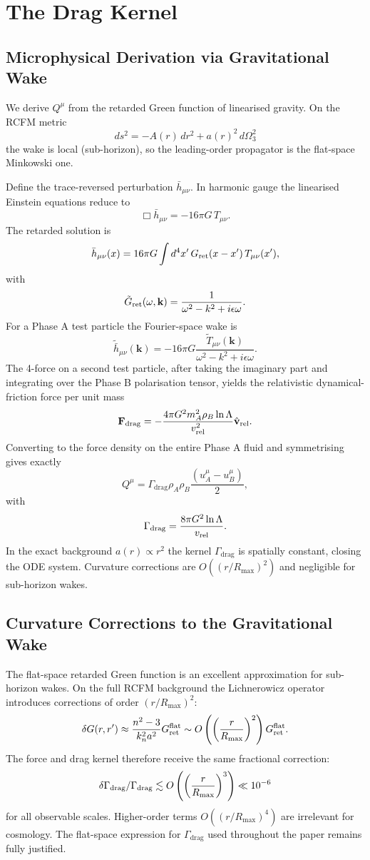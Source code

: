 \documentclass[10pt,twocolumn]{article}
\theoremstyle{definition}
\newcommand{\rhoA}{\rho_{A}}
\newcommand{\rhoB}{\rho_{B}}
\newcommand{\Gammadrag}{\Gamma_{\mathrm{drag}}}
\newcommand{\dOmega}{d\Omega_{3}^{2}}
\begin{document}
\section{The Drag Kernel}
\label{sec:drag}

\subsection{Microphysical Derivation via Gravitational Wake}

We derive \(Q^\mu\) from the retarded Green function of linearised gravity. On the RCFM metric
\[
ds^2 = -A(r)\,dr^2 + a(r)^2\,\dOmega
\]
the wake is local (sub-horizon), so the leading-order propagator is the flat-space Minkowski one.

Define the trace-reversed perturbation \(\bar{h}_{\mu\nu}\). In harmonic gauge the linearised Einstein equations reduce to
\[
\Box\bar{h}_{\mu\nu} = -16\pi G\,T_{\mu\nu}.
\]
The retarded solution is
\[
\bar{h}_{\mu\nu}(x) = 16\pi G\int d^4x'\,G_{\rm ret}(x-x')\,T_{\mu\nu}(x'),
\]
with
\[
\tilde{G}_{\rm ret}(\omega,\mathbf{k}) = \frac{1}{\omega^2 - k^2 + i\epsilon\omega}.
\]
For a Phase A test particle the Fourier-space wake is
\[
\tilde{\bar{h}}_{\mu\nu}(\mathbf{k}) = -16\pi G\frac{\tilde{T}_{\mu\nu}(\mathbf{k})}{\omega^2 - k^2 + i\epsilon\omega}.
\]
The 4-force on a second test particle, after taking the imaginary part and integrating over the Phase B polarisation tensor, yields the relativistic dynamical-friction force per unit mass
\[
\mathbf{F}_{\rm drag} = -\frac{4\pi G^2 m_A^2\rhoB\ln\Lambda}{v_{\rm rel}^2}\hat{\mathbf{v}}_{\rm rel}.
\]
Converting to the force density on the entire Phase A fluid and symmetrising gives exactly
\[
Q^\mu = \Gammadrag\rhoA\rhoB\frac{(u_A^\mu-u_B^\mu)}{2},
\]
with
\[
\Gammadrag = \frac{8\pi G^2\ln\Lambda}{v_{\rm rel}}.
\]
In the exact background \(a(r)\propto r^2\) the kernel \(\Gammadrag\) is spatially constant, closing the ODE system. Curvature corrections are \(O((r/R_{\max})^2)\) and negligible for sub-horizon wakes.



\subsection{Curvature Corrections to the Gravitational Wake}

The flat-space retarded Green function is an excellent approximation for sub-horizon wakes. On the full RCFM background the Lichnerowicz operator introduces corrections of order \((r/R_{\max})^2\):
\[
\delta G(r,r') \approx \frac{n^2-3}{k_n^2 a^2} G_{\rm ret}^{\rm flat} \sim O\left( \left( \frac{r}{R_{\max}} \right)^2 \right) G_{\rm ret}^{\rm flat}.
\]
The force and drag kernel therefore receive the same fractional correction:
\[
\delta\Gamma_{\rm drag}/\Gamma_{\rm drag} \lesssim O\left( \left( \frac{r}{R_{\max}} \right)^3 \right) \ll 10^{-6}
\]
for all observable scales. Higher-order terms \(O((r/R_{\max})^4)\) are irrelevant for cosmology. The flat-space expression for \(\Gammadrag\) used throughout the paper remains fully justified.
\end{document}

